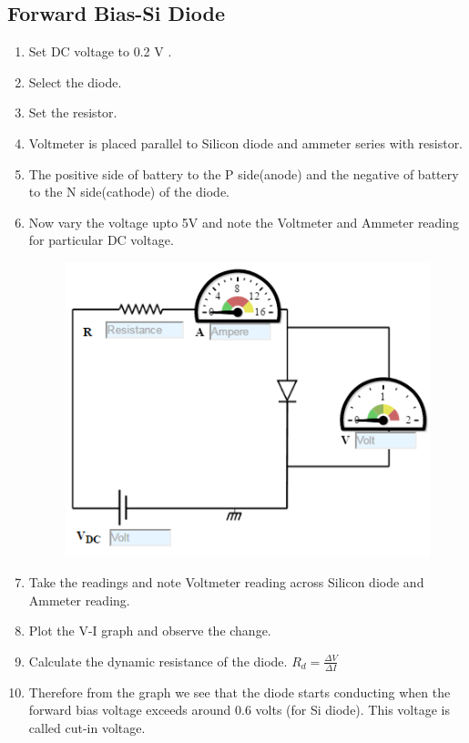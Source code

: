 		\subsection{Forward Bias-Si Diode}
			\begin{enumerate}
				\tightlist
				\item Set DC voltage to 0.2 V .
				\item Select the diode.
				\item Set the resistor.
				\item Voltmeter is placed parallel to Silicon diode and ammeter series with resistor.
				\item The positive side of battery to the P side(anode) and the negative of battery to the N side(cathode) of the diode.
				\item Now vary the voltage upto 5V and note the Voltmeter and Ammeter reading for particular DC voltage.
				\begin{figure}[h]
					\centering
					\includegraphics[width=0.3\linewidth]{img/exp5/7}
					\caption{}
					\label{fig:pnjfp}
				\end{figure}
				\item Take the readings and note Voltmeter reading across Silicon diode and Ammeter reading.
				\item Plot the V-I graph and observe the change.
				\item Calculate the dynamic resistance of the diode. $R_d = \frac{\Delta V}{\Delta I}$
				\item Therefore from the graph we see that the diode starts conducting when the forward bias voltage exceeds around 0.6 volts (for Si diode). This voltage is called cut-in voltage.
			\end{enumerate}
		
